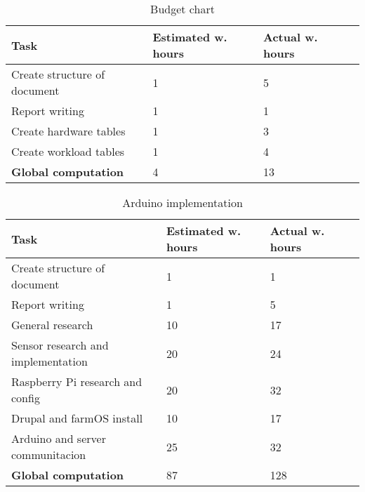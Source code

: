 \begin{table}[H]
\caption{Budget chart}
\begin{tabular}{llll}
\hline
                               \textbf{Task}    & \textbf{Estimated w. hours} & \textbf{Actual w. hours} \\ \hline
\rowcolor{lightgray}
Create structure of document                    & 1                           & 5                      \\
Report writing                                  & 1                           & 1                      \\
\rowcolor{lightgray}
Create hardware tables                          & 1                           & 3                     \\
Create workload tables                          & 1                           & 4                      \\
\rowcolor{lightgray}
\textbf{Global computation}                     & 4                          & 13                     \\
\end{tabular}
\end{table}

\begin{table}[H]
\caption{Arduino implementation}
\begin{tabular}{llll}
\hline
                               \textbf{Task}    & \textbf{Estimated w. hours} & \textbf{Actual w. hours} \\ \hline
\rowcolor{lightgray}
Create structure of document                    & 1                           & 1                      \\
Report writing                                  & 1                           & 5                      \\
\rowcolor{lightgray}
General research                                & 10                          & 17                     \\
Sensor research and implementation              & 20                          & 24                      \\
\rowcolor{lightgray}
Raspberry Pi research and config                & 20                          & 32                      \\
Drupal and farmOS install                       & 10                          & 17                      \\
\rowcolor{lightgray}
Arduino and server communitacion                & 25                          & 32                      \\
\textbf{Global computation}                     & 87                          & 128                     \\
\end{tabular}
\end{table}

